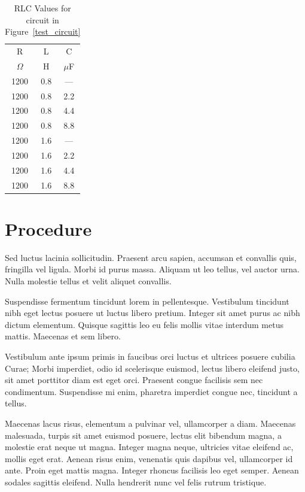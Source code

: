\documentclass{article}
\begin{document}
\begin{table}[h]
  \begin{center}
    \begin{tabular}{ccc}
      \hline
      R & L & C \\
      $\Omega$ & H & $\mu$F \\
      \hline
      1200 & 0.8 & --- \\ 1200 & 0.8 & 2.2 \\ 1200 & 0.8 & 4.4 \\
      1200 & 0.8 & 8.8 \\ 1200 & 1.6 & --- \\ 1200 & 1.6 & 2.2 \\
      1200 & 1.6 & 4.4 \\ 1200 & 1.6 & 8.8 \\
      \hline
    \end{tabular}
    \caption{RLC Values for circuit in Figure~\ref{test_circuit}}
    \label{testc_dat}
  \end{center}
\end{table}

\section{Procedure}
Sed luctus lacinia sollicitudin. Praesent arcu sapien, accumsan et convallis
quis, fringilla vel ligula. Morbi id purus massa. Aliquam ut leo tellus, vel
auctor urna. Nulla molestie tellus et velit aliquet convallis.

Suspendisse fermentum tincidunt lorem in pellentesque. Vestibulum tincidunt
nibh eget lectus posuere ut luctus libero pretium. Integer sit amet purus ac
nibh dictum elementum. Quisque sagittis leo eu felis mollis vitae interdum
metus mattis. Maecenas et sem libero.

Vestibulum ante ipsum primis in faucibus orci luctus et ultrices posuere
cubilia Curae; Morbi imperdiet, odio id scelerisque euismod, lectus libero
eleifend justo, sit amet porttitor diam est eget orci. Praesent congue
facilisis sem nec condimentum. Suspendisse mi enim, pharetra imperdiet congue
nec, tincidunt a tellus.

Maecenas lacus risus, elementum a pulvinar vel, ullamcorper a diam. Maecenas
malesuada, turpis sit amet euismod posuere, lectus elit bibendum magna, a
molestie erat neque ut magna. Integer magna neque, ultricies vitae eleifend ac,
mollis eget erat. Aenean risus enim, venenatis quis dapibus vel, ullamcorper id
ante. Proin eget mattis magna. Integer rhoncus facilisis leo eget semper.
Aenean sodales sagittis eleifend. Nulla hendrerit nunc vel felis rutrum
tristique. 
\end{document}
